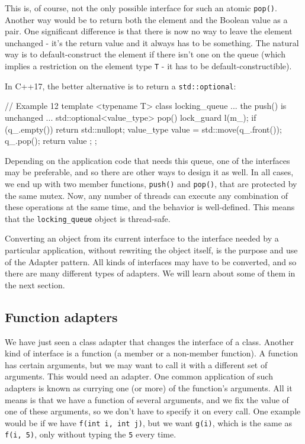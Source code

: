 This is, of course, not the only possible interface for such an atomic \texttt{pop()}. Another way would be to return both the element and the Boolean value as a pair. One significant difference is that there is now no way to leave the element unchanged - it's the return value and it always has to be something. The natural way is to default-construct the element if there isn't one on the queue (which implies a restriction on the element type \texttt{T} - it has to be default-constructible).

In C++17, the better alternative is to return a \texttt{std::optional}:

\begin{code}
// Example 12
template <typename T> class locking_queue {
  ... the push() is unchanged ...
  std::optional<value_type> pop() {
    lock_guard l(m_);
    if (q_.empty()) return std::nullopt;
    value_type value = std::move(q_.front());
    q_.pop();
    return { value };
  }
};
\end{code}

Depending on the application code that needs this queue, one of the interfaces may be preferable, and so there are other ways to design it as well. In all cases, we end up with two member functions, \texttt{push()} and \texttt{pop()}, that are protected by the same mutex. Now, any number of threads can execute any combination of these operations at the same time, and the behavior is well-defined. This means that the \texttt{locking\_queue} object is thread-safe.

Converting an object from its current interface to the interface needed by a particular application, without rewriting the object itself, is the purpose and use of the Adapter pattern. All kinds of interfaces may have to be converted, and so there are many different types of adapters. We will learn about some of them in the next section.

\subsection{Function adapters}

We have just seen a class adapter that changes the interface of a class. Another kind of interface is a function (a member or a non-member function). A function has certain arguments, but we may want to call it with a different set of arguments. This would need an adapter. One common application of such adapters is known as currying one (or more) of the function's arguments. All it means is that we have a function of several arguments, and we fix the value of one of these arguments, so we don't have to specify it on every call. One example would be if we have \texttt{f(int\ i,\ int\ j)}, but we want \texttt{g(i)}, which is the same as \texttt{f(i,\ 5)}, only without typing the \texttt{5} every time.

